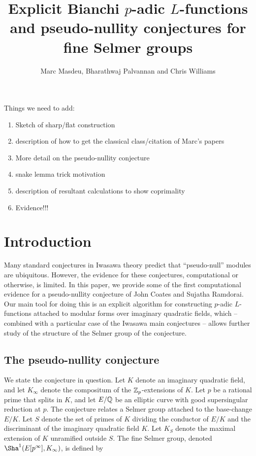 \documentclass[a4paper,10pt]{article}
\title{Explicit Bianchi $p$-adic $L$-functions and pseudo-nullity conjectures for fine Selmer groups}
\author{Marc Masdeu, Bharathwaj Palvannan and Chris Williams}
\date{}
\numberwithin{equation}{section}
\begin{document}
%
%

\maketitle



Things we need to add:
\begin{enumerate}
    \item Sketch of sharp/flat construction
    \item description of how to get the classical class/citation of Marc's papers
    \item More detail on the pseudo-nullity conjecture
    \item snake lemma trick motivation
    \item description of resultant calculations to show coprimality
    \item Evidence!!!
\end{enumerate}
\section{Introduction}

Many standard conjectures in Iwasawa theory predict that ``pseudo-null'' modules are ubiquitous. However,  the evidence for these conjectures, computational or otherwise, is limited. In this paper, we provide some of the first computational evidence for a pseudo-nullity conjecture of John Coates and Sujatha Ramdorai. Our main tool for doing this is an explicit algorithm for constructing $p$-adic $L$-functions attached to modular forms over imaginary quadratic fields, which -- combined with a particular case of the Iwasawa main conjectures -- allows further study of the structure of the Selmer group of the conjecture.


\subsection{The pseudo-nullity conjecture}
We state the conjecture in question. Let $K$ denote an imaginary quadratic field, and let $K_\infty$ denote the compositum of the $\mathbb{Z}_p$-extensions of $K$. Let $p$ be a rational prime that splits in $K$, and let $E/\mathbb{Q}$ be an elliptic curve with good supersingular reduction at $p$. The conjecture relates a Selmer group attached to the base-change $E/K$. Let $S$ denote the set of primes of $K$ dividing the conductor of $E/K$ and the discriminant of the imaginary quadratic field $K$. Let $K_S$ denote the maximal extension of $K$ unramified outside $S$. The fine Selmer group, denoted $\Sha^1(E[p^\infty],K_\infty)$, is defined by
\end{document}
